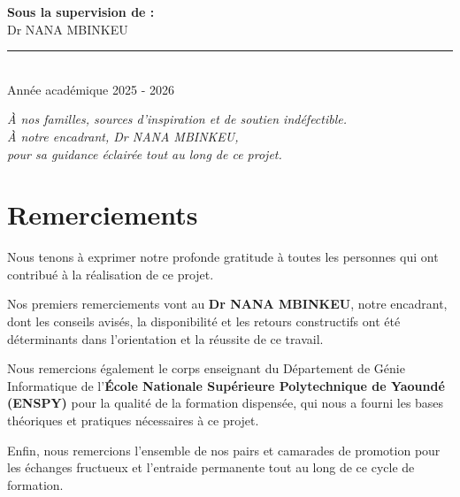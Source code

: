 \documentclass[12pt,a4paper]{report}
\begin{document}
\begin{titlepage}
\begin{center}
\begin{minipage}{0.45\textwidth}
\end{minipage}


\vfill

\raggedleft
{\small\bfseries\textcolor{ENSPYorange}{Sous la supervision de  :}}\\[0.2cm]
{\small Dr NANA MBINKEU}\\[0.5cm] 


\begin{center}
\textcolor{ENSPYorange}{\rule{14cm}{1.5pt}}\\[0.2cm]
{\fontsize{13}{16}\selectfont
  Année académique 2025 - 2026 }
\end{center}
\end{center}
\end{titlepage}
\nopagecolor

\newpage\thispagestyle{empty}
\vspace*{6cm}
\begin{center}
\itshape\large
À nos familles, sources d'inspiration et de soutien indéfectible.\\[0.4cm]
À notre encadrant, Dr NANA MBINKEU,\\
pour sa guidance éclairée tout au long de ce projet.
\end{center}

\newpage\thispagestyle{empty}
\chapter*{Remerciements}

Nous tenons à exprimer notre profonde gratitude à toutes les personnes qui ont contribué à la réalisation de ce projet.

Nos premiers remerciements vont au \textbf{Dr NANA MBINKEU}, notre encadrant, dont les conseils avisés, la disponibilité et les retours constructifs ont été déterminants dans l'orientation et la réussite de ce travail.

Nous remercions également le corps enseignant du Département de Génie Informatique de l'\textbf{École Nationale Supérieure Polytechnique de Yaoundé (ENSPY)} pour la qualité de la formation dispensée, qui nous a fourni les bases théoriques et pratiques nécessaires à ce projet.

Enfin, nous remercions l'ensemble de nos pairs et camarades de promotion pour les échanges fructueux et l'entraide permanente tout au long de ce cycle de formation.
\end{document}
